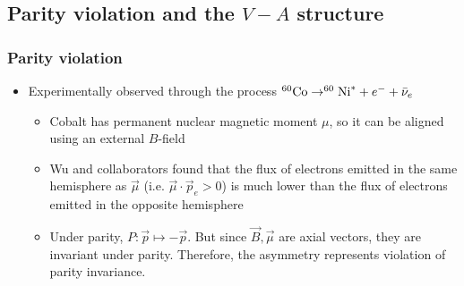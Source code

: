\subsection{Parity violation and the $V-A$ structure}
\subsubsection{Parity violation}
\begin{itemize}
  \item Experimentally observed through the process $^{60}\text{Co}\rightarrow^{60}\text{Ni}^* + e^{-} + {\bar{\nu}}_e$
  \begin{itemize}
    \item Cobalt has permanent nuclear magnetic moment $\mu$, so it can be aligned using an external $B$-field
    \item Wu and collaborators found that the flux of electrons emitted in the same hemisphere as $\vec\mu$ (i.e. $\vec\mu\cdot \vec p_e>0$) is much lower than the flux of electrons emitted in the opposite hemisphere
    \item Under parity, $P:\vec p \mapsto - \vec p$. But since $\vec B,\vec \mu$ are axial vectors, they are invariant under parity. Therefore, the asymmetry represents violation of parity invariance.
  \end{itemize}
\end{itemize}
